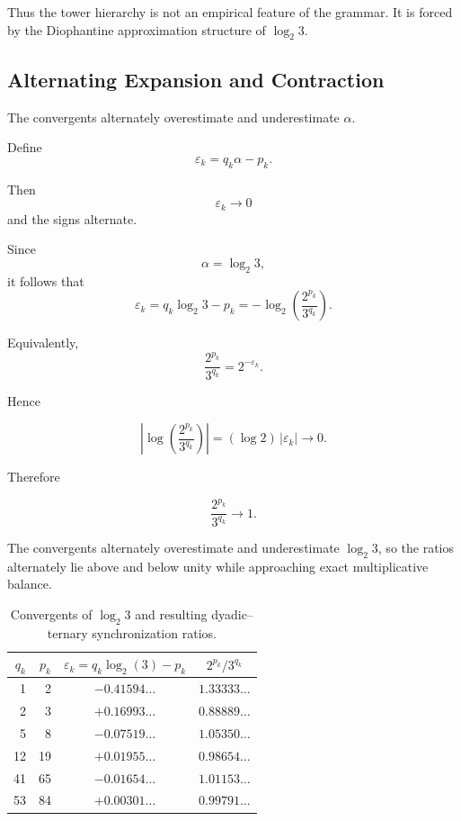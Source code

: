 \documentclass[12pt, oneside]{article}
\numberwithin{equation}{section}
\theoremstyle{definition}
\theoremstyle{plain}
\theoremstyle{remark}
\begin{document}
Thus the tower hierarchy is not an empirical feature of the grammar.
It is forced by the Diophantine approximation structure of $\log_2 3$.

\subsection{Alternating Expansion and Contraction}

The convergents alternately overestimate and underestimate $\alpha$.

Define
\[
\varepsilon_k = q_k\alpha-p_k.
\]

Then
\[
\varepsilon_k \to 0
\]
and the signs alternate.

Since
\[
\alpha=\log_2 3,
\]
it follows that
\[
\varepsilon_k = q_k\log_2 3-p_k = -\log_2\!\left(\frac{2^{p_k}}{3^{q_k}}\right).
\]

Equivalently,
\[
\frac{2^{p_k}}{3^{q_k}} = 2^{-\varepsilon_k}.
\]

Hence

\[
\left|
\log\!\left(
\frac{2^{p_k}}{3^{q_k}}
\right)
\right|
=
(\log 2)\,|\varepsilon_k|
\to0.
\]

Therefore

\[
\frac{2^{p_k}}{3^{q_k}}
\to1.
\]

The convergents alternately overestimate and underestimate
$\log_2 3$, so the ratios alternately lie above and below unity while
approaching exact multiplicative balance.

\begin{table}[ht]
\centering
\caption{Convergents of $\log_2 3$ and resulting
dyadic--ternary synchronization ratios.}
\label{tab:tower-ratios}
\begin{tabular}{r r c c}
\hline
$q_k$ & $p_k$ &
$\varepsilon_k=q_k\log_2(3)-p_k$ &
$\displaystyle 2^{p_k} / 3^{q_k}$ \\
\hline
 1 &  2 & $-0.41594\ldots$ & $1.33333\ldots$ \\
 2 &  3 & $+0.16993\ldots$ & $0.88889\ldots$ \\
 5 &  8 & $-0.07519\ldots$ & $1.05350\ldots$ \\
12 & 19 & $+0.01955\ldots$ & $0.98654\ldots$ \\
41 & 65 & $-0.01654\ldots$ & $1.01153\ldots$ \\
53 & 84 & $+0.00301\ldots$ & $0.99791\ldots$ \\
\hline
\end{tabular}
\end{table}
\end{document}
